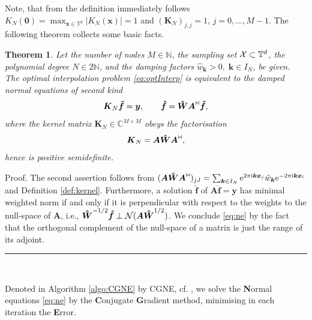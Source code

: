 \documentclass[11pt,a4paper,bibtotoc]{scrartcl}
\def\N{\mathbb{N}}
\def\C{\mathbb{C}}
\def\T{\mathbb{T}}
\def\ti{\mbox{\scriptsize{\rm i}}}
\newcommand{\eip}[1]{{\rm e}^{ 2\pi{\ti} #1}}
\newcommand{\eim}[1]{{\rm e}^{-2\pi{\ti} #1}}
\newcommand{\zb}[1]{\ensuremath{\boldsymbol{#1}}}
\newcommand{\adj}{{\vdash \hspace*{-1.72mm} \dashv}}
\newcommand{\indexset}{{I_N}}
\renewcommand{\Box}{\hspace*{0ex} \hfill \rule{1.5ex}{1.5ex} \\ \goodbreak}
\newtheorem{theorem}{Theorem}[section]
\newenvironment{Theorem}{\goodbreak \begin{theorem}\sl}{\end{theorem}}
\numberwithin{equation}{section}
\numberwithin{table}{section}
\numberwithin{figure}{section}
\begin{document}
Note, that from the definition immediately follows $K_N(\zb 0)=\max_{\zb
  x\in\T^d} |K_N(\zb x)|=1$ and $(\zb K_N)_{j,j}=1$, $j=0,\hdots,M-1$.
The following theorem collects some basic facts.
\begin{Theorem}\label{theorem:ne}
  Let the number of nodes $M\in\N$, the sampling set ${\cal X}\subset\T^d$,
  the polynomial degree $N \in 2\N$, and the damping factors $\hat w_{\zb
  k}>0,\; \zb k \in \indexset$, be given.
  The optimal interpolation problem \eqref{eq:optInterp} is equivalent
  to the {\em damped normal equations of second kind}
  \begin{equation}\label{eq:ne}
    \zb K_N \zb {\tilde f} = \zb y,\qquad \zb {\hat
      f}=\zb {\hat W} \zb A^{\adj} \zb {\tilde f},
  \end{equation}
  where the kernel matrix $\zb K_N\in \C^{M\times M}$ obeys the factorisation
  \begin{equation}\label{eq:fact}
    \zb K_N = \zb A \zb {\hat W} \zb A^{\adj},
  \end{equation}
  hence is positive semidefinite.
\end{Theorem}
Proof.
The second assertion follows from $(\zb A \zb
{\hat W} \zb A^{\adj})_{j,l}=\sum_{\zb k \in \indexset} \eip{\zb k \zb x_j}
\hat w_{\zb k} \eim{\zb k \zb x_l}$ and Definition \ref{def:kernel}.
Furthermore, a solution $\zb {\hat f}$ of $\zb A \zb {\hat f}=\zb y$ has
minimal weighted norm if and only if it is perpendicular with respect to the
weights to the null-space of $\zb A$, i.e., $\zb {\hat W}^{-{1}/{2}} \zb {\hat
  f} \perp {\cal N}(\zb A \zb {\hat W}^{{1}/{2}})$.
We conclude \eqref{eq:ne} by the fact that the orthogonal complement of
the null-space of a matrix is just the range of its adjoint.
 \Box

Denoted in Algorithm \ref{algo:CGNE} by CGNE, cf. \cite[pp. 288]{Bj96}, we
solve the {\bf N}ormal equations \eqref{eq:ne} by the {\bf C}onjugate {\bf
  G}radient method, minimising in each iteration the {\bf E}rror.
\end{document}
